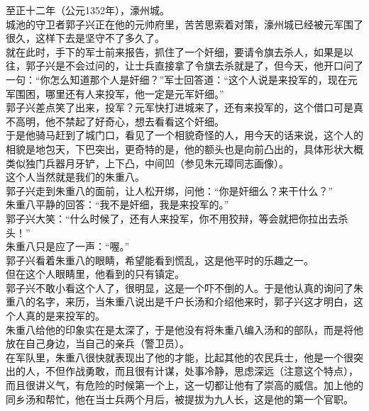 	\begin{multicols}{\theparacolNo}
\fi
至正十二年（公元1352年），濠州城。\\

城池的守卫者郭子兴正在他的元帅府里，苦苦思索着对策，濠州城已经被元军围了很久，这样下去是坚守不了多久了。\\

就在此时，手下的军士前来报告，抓住了一个奸细，要请令旗去杀人，如果是以往，郭子兴是不会过问的，让士兵直接拿了令旗去杀就是了，但今天，他开口问了一句：“你怎么知道那个人是奸细？”军士回答道：“这个人说是来投军的，现在元军围困，哪里还有人来投军，他一定是元军奸细。”\\

郭子兴差点笑了出来，投军？元军快打进城来了，还有来投军的，这个借口可是真不高明，他不禁起了好奇心，想去看看这个奸细。\\

于是他骑马赶到了城门口，看见了一个相貌奇怪的人，用今天的话来说，这个人的相貌是地包天，下巴突出，更奇特的是，他的额头也是向前凸出的，具体形状大概类似独门兵器月牙铲，上下凸，中间凹（参见朱元璋同志画像）。\\

这个人当然就是我们的朱重八。\\

郭子兴走到朱重八的面前，让人松开绑，问他：“你是奸细么？来干什么？”\\

朱重八平静的回答：“我不是奸细，我是来投军的。”\\

郭子兴大笑：“什么时候了，还有人来投军，你不用狡辩，等会就把你拉出去杀头！”\\

朱重八只是应了一声：“喔。”\\

郭子兴看着朱重八的眼睛，希望能看到慌乱，这是他平时的乐趣之一。\\

但在这个人眼睛里，他看到的只有镇定。\\

郭子兴不敢小看这个人了，很明显，这是一个吓不倒的人。于是他认真的询问了朱重八的名字，来历，当朱重八说出是千户长汤和介绍他来时，郭子兴这才明白，这个人真的是来投军的。\\

朱重八给他的印象实在是太深了，于是他没有将朱重八编入汤和的部队，而是将他放在自己身边，当自己的亲兵（警卫员）。\\

在军队里，朱重八很快就表现出了他的才能，比起其他的农民兵士，他是一个很突出的人，不但作战勇敢，而且很有计谋，处事冷静，思虑深远（注意这个特点），而且很讲义气，有危险的时候第一个上，这一切都让他有了崇高的威信。加上他的同乡汤和帮忙，他在当士兵两个月后，被提拔为九人长，这是他的第一个官职。\\


\end{multicols}

